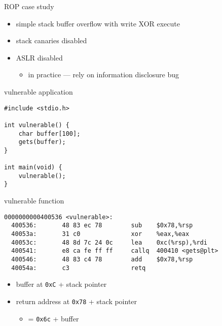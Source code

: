 \usetikzlibrary{arrows.meta,shapes.multipart}

\begin{frame}{ROP case study}
    \begin{itemize}
    \item simple stack buffer overflow with write XOR execute
    \item stack canaries disabled
    \item ASLR disabled
        \begin{itemize}
        \item in practice --- rely on information disclosure bug
        \end{itemize}
    \end{itemize}
\end{frame}

\begin{frame}[fragile,label=vuln]{vulnerable application}
    \lstset{language=C,style=small}
\begin{lstlisting}
#include <stdio.h>

int vulnerable() {
    char buffer[100];
    gets(buffer);
}

int main(void) {
    vulnerable();
}
\end{lstlisting}
\end{frame}

\begin{frame}[fragile,label=vulnFunc]{vulnerable function}
    \lstset{language=myasm,style=small}
\begin{lstlisting}
0000000000400536 <vulnerable>:
  400536:       48 83 ec 78        sub    $0x78,%rsp
  40053a:       31 c0              xor    %eax,%eax
  40053c:       48 8d 7c 24 0c     lea    0xc(%rsp),%rdi
  400541:       e8 ca fe ff ff     callq  400410 <gets@plt>
  400546:       48 83 c4 78        add    $0x78,%rsp
  40054a:       c3                 retq   
\end{lstlisting}
    \begin{itemize}
        \item<2> buffer at \texttt{0xC} + stack pointer
        \item<2> return address at \texttt{0x78} + stack pointer
            \begin{itemize}
                \item = \texttt{0x6c} + buffer
            \end{itemize}
    \end{itemize}
\end{frame}

